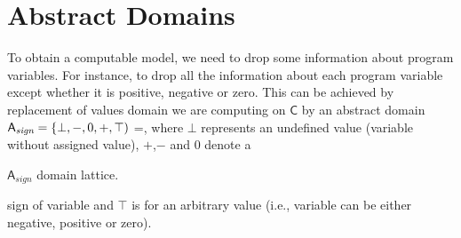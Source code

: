 \section{Abstract Domains}
\label{sec:domains}

To obtain a computable model, we need to drop some information about program
variables. For instance, to drop all the information about each program
variable except whether it is positive, negative or zero. This can be achieved
by replacement of values domain we are computing on $\mathsf{C}$ by an abstract
domain $\mathsf{A}_{\textit{sign}} = \{ \bot, -, 0, +, \top)$ =, where $\bot$ represents an
undefined value (variable without assigned value), $+$,$-$ and $0$ denote a
\begin{marginfigure}%
    \centering
    \caption{$\mathsf{A}_{\textit{sign}}$ domain lattice.}
    \label{fig:signd}%
\end{marginfigure}%
sign of variable and $\top$ is for an arbitrary value (i.e., variable can be
either negative, positive or zero).

